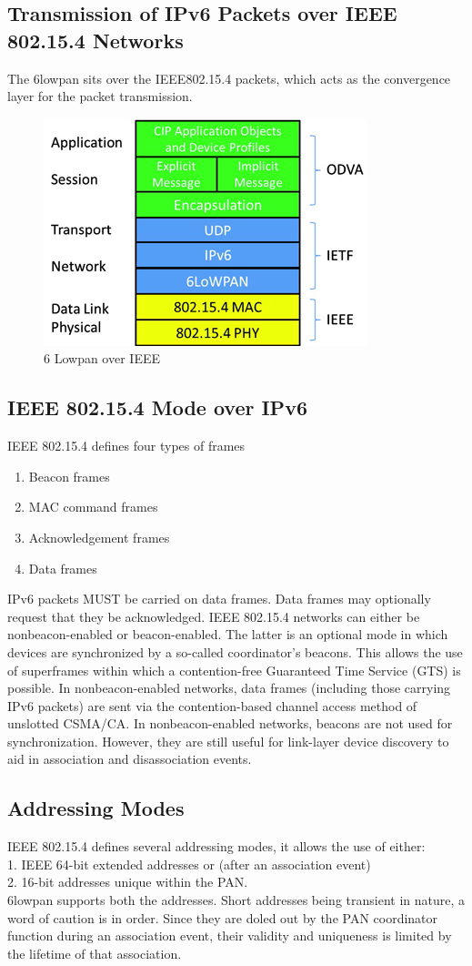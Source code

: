 \subsection{Transmission of IPv6 Packets over IEEE 802.15.4 Networks}
The 6lowpan sits over the IEEE802.15.4 packets, which acts as the convergence layer for the packet transmission.
\begin{figure}[ht]
	\centering
	\includegraphics[scale=1]{images/6lowpan.png}
	\caption{6 Lowpan over IEEE}
\end{figure}
\subsection{IEEE 802.15.4 Mode over IPv6} 
IEEE 802.15.4 defines four types of frames\\
\begin{enumerate}
	\item{Beacon frames}
	\item{MAC command frames}
	\item{Acknowledgement frames}
	\item{Data frames}
\end{enumerate}
IPv6 packets MUST be carried on data frames. Data frames may optionally request that they be acknowledged. IEEE 802.15.4 networks can either be nonbeacon-enabled or beacon-enabled.  The latter is an optional mode in which devices are synchronized by a so-called coordinator's beacons.  This allows the use of superframes within which a contention-free Guaranteed Time Service (GTS) is possible. In nonbeacon-enabled networks, data frames (including those carrying IPv6 packets) are sent via the contention-based channel access method of unslotted CSMA/CA. In nonbeacon-enabled networks, beacons are not used for synchronization. However, they are still useful for link-layer device discovery to aid in association and disassociation events.
\subsection{Addressing Modes}
IEEE 802.15.4 defines several addressing modes, it allows the use of either:\\
1. IEEE 64-bit extended addresses or (after an association event)\\
2. 16-bit addresses unique within the PAN.\\
6lowpan supports both the addresses. Short addresses being transient in nature, a word of caution is in order. Since they are doled out by the PAN coordinator function during an association event, their validity and uniqueness is limited by the lifetime of that association.

